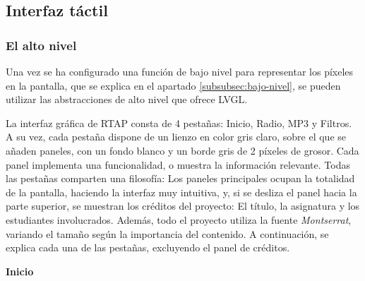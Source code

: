 \subsection{Interfaz táctil}

\subsubsection{El alto nivel}
\label{subsubsec:alto-nivel}
Una vez se ha configurado una función de bajo nivel para representar los píxeles en la pantalla, que se explica en el apartado \ref{subsubsec:bajo-nivel}, se pueden utilizar las abstracciones de alto nivel que ofrece LVGL. 

La interfaz gráfica de RTAP consta de 4 pestañas: Inicio, Radio, MP3 y Filtros. A su vez, cada pestaña dispone de un lienzo en color gris claro, sobre el que se añaden paneles, con un fondo blanco y un borde gris de 2 píxeles de grosor. Cada panel implementa una funcionalidad, o muestra la información relevante. Todas las pestañas comparten una filosofía: Los paneles principales ocupan la totalidad de la pantalla, haciendo la interfaz muy intuitiva, y, si se desliza el panel hacia la parte superior, se muestran los créditos del proyecto: El título, la asignatura y los estudiantes involucrados. Además, todo el proyecto utiliza la fuente \textit{Montserrat}, variando el tamaño según la importancia del contenido. A continuación, se explica cada una de las pestañas, excluyendo el panel de créditos. 

\textbf{Inicio}

